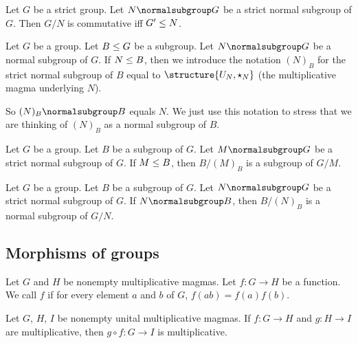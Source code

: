 \begin{theorem}
Let $G$ be a strict group.
Let $N\normalsubgroup G$ be a strict normal subgroup of $G$.
Then $G/N$ is commutative iff $G'\leq N$.
\end{theorem}

\begin{definition}
Let $G$ be a group. Let $B\leq G$ be a subgroup.
Let $N\normalsubgroup G$ be a normal subgroup of $G$.
If $N\leq B$, then we introduce the notation $(N)_{B}$ for the
strict normal subgroup of $B$ equal to $\structure{U_{N},\star_{N}}$ (the
multiplicative magma underlying $N$).

So $(N)_{B}\normalsubgroup B$ equals $N$. We just use this notation to
stress that we are thinking of $(N)_{B}$ as a normal subgroup of $B$.
\end{definition}

\begin{theorem}
Let $G$ be a group. Let $B$ be a subgroup of $G$.
Let $M\normalsubgroup G$ be a strict normal subgroup of $G$.
If $M\leq B$, then $B/(M)_{B}$ is a subgroup of $G/M$.
\end{theorem}

\begin{theorem}
Let $G$ be a group. Let $B$ be a subgroup of $G$.
Let $N\normalsubgroup G$ be a strict normal subgroup of $G$.
If $N\normalsubgroup B$, then $B/(N)_{B}$ is a normal subgroup of $G/N$.
\end{theorem}

\subsection{Morphisms of groups}

\begin{definition}
Let $G$ and $H$ be nonempty multiplicative magmas.
Let $f\colon G\to H$ be a function.
We call $f$  if for every element $a$ and $b$
of $G$, $f(ab)=f(a)f(b)$.
\end{definition}

\begin{theorem}
Let $G$, $H$, $I$ be nonempty unital multiplicative magmas.
If $f\colon G\to H$ and $g\colon H\to I$ are multiplicative,
then $g\circ f\colon G\to I$ is multiplicative.
\end{theorem}

